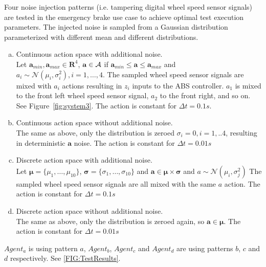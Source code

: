 \documentclass[a4paper, fleqn]{template/cas-dc}
\begin{document}
	Four noise injection patterns (i.e. tampering digital wheel speed sensor signals) are tested in the emergency brake use case to achieve optimal test execution parameters. The injected noise is sampled from a Gaussian distribution parameterized with different mean and different distributions.
	
	\begin{enumerate}[a)]
		\item Continuous action space with additional noise.\\
		Let $\mathbf{a}_{min}, \mathbf{a}_{max} \in \mathbf{R}^4$, $\mathbf{a} \in \mathcal{A}$ if $\mathbf{a}_{min} \leq \mathbf{a} \leq \mathbf{a}_{max}$ and $a_i \sim \mathcal{N}(\mu_i, \sigma_i^2), i=1,\ldots,4$. The sampled wheel speed sensor signals are mixed with $a_i$ actions resulting in $z_i$ inputs to the ABS controller. $a_1$ is mixed to the front left wheel speed sensor signal, $a_2$ to the front right, and so on. See Figure~\ref{fig:system3}. The action is constant for $\Delta t = 0.1 s$.\\
		\item Continuous action space without additional noise.\\
		The same as above, only the distribution is zeroed $\sigma_i=0, i=1,..4$, resulting in deterministic $\textbf{a}$ noise. The action is constant for $\Delta t = 0.01 s$
		\item Discrete action space with additional noise.\\
		Let $\boldsymbol{\mu} = \{\mu_1,\ldots,\mu_{10} \}$, $\boldsymbol{\sigma} = \{\sigma_1,\ldots,\sigma_{10}\}$ and $\textbf{a} \in \boldsymbol{\mu} \times \boldsymbol{\sigma}$ and $a \sim \mathcal{N}(\mu_i, \sigma_j^2)$ The sampled wheel speed sensor signals are all mixed with the same $a$ action. The action is constant for $\Delta t = 0.1 s$
		\item Discrete action space without additional noise.\\
		The same as above, only the distribution is zeroed again, so $\textbf{a} \in \boldsymbol{\mu}$. The action is constant for $\Delta t = 0.01 s$
	\end{enumerate}                        		
	
	$Agent_a$ is using pattern $a$, $Agent_b$, $Agent_c$ and $Agent_d$ are using patterns $b$, $c$ and $d$ respectively. See \autoref{FIG:TestResults}.
			
\end{document}
